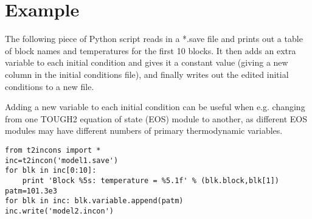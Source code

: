 \section{Example}

The following piece of Python script reads in a *.save file and prints out a table of block names and temperatures for the first 10 blocks.  It then adds an extra variable to each initial condition and gives it a constant value (giving a new column in the initial conditions file), and finally writes out the edited initial conditions to a new file.

Adding a new variable to each initial condition can be useful when e.g. changing from one TOUGH2 equation of state (EOS) module to another, as different EOS modules may have different numbers of primary thermodynamic variables.

\begin{verbatim}
from t2incons import *
inc=t2incon('model1.save')
for blk in inc[0:10]:
    print 'Block %5s: temperature = %5.1f' % (blk.block,blk[1])
patm=101.3e3
for blk in inc: blk.variable.append(patm)
inc.write('model2.incon')

\end{verbatim}

